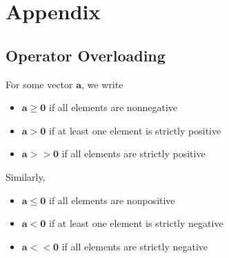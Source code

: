 \documentclass[11pt]{article}
\begin{document}
\section{Appendix}
\subsection{Operator Overloading}
For some vector $\boldsymbol{a}$, we write
\begin{itemize}
    \item $\boldsymbol{a} \ge \boldsymbol{0}$ if all elements are nonnegative
    \item $\boldsymbol{a} > \boldsymbol{0}$ if at least one element is strictly positive
    \item $\boldsymbol{a} >> \boldsymbol{0}$ if all elements are strictly positive
\end{itemize}
Similarly,
\begin{itemize}
    \item $\boldsymbol{a} \le \boldsymbol{0}$ if all elements are nonpositive
    \item $\boldsymbol{a} < \boldsymbol{0}$ if at least one element is strictly negative
    \item $\boldsymbol{a} << \boldsymbol{0}$ if all elements are strictly negative
\end{itemize}
\end{document}
